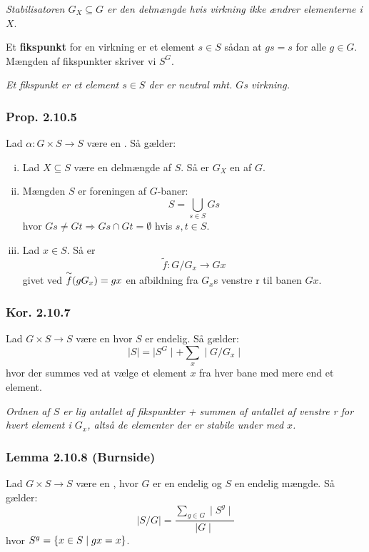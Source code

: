 \textit{Stabilisatoren $G_X \subseteq G$ er den delmængde hvis virkning
ikke ændrer elementerne i $X$}.

Et \textbf{fikspunkt} for en virkning er et element $s \in S$ sådan at $gs = s$
for alle $g \in G$. Mængden af fikspunkter skriver vi $S^G$.

\textit{Et fikspunkt er et element $s \in S$ der er neutral mht. $G$s virkning.}

\subsubsection{Prop. 2.10.5}
Lad $\alpha: G \times S \rightarrow S$ være en . Så
gælder: \begin{enumerate}[(i)]
  \item Lad $X \subseteq S$ være en delmængde af $S$. Så er $G_X$ en
   af $G$.
  \item Mængden $S$ er foreningen af $G$-baner:
  \begin{equation*}
  S = \bigcup_{s \in S}Gs
  \end{equation*}
  hvor $Gs \neq Gt \Rightarrow Gs \cap Gt = \emptyset$ hvis $s, t \in S$.
  \item Lad $x \in S$. Så er
  \begin{equation*}
  \tilde{f}: G/G_x \rightarrow Gx
  \end{equation*}
  givet ved $\overset{\sim}{f}(gG_x) = gx$ en  
  afbildning fra $G_x$s venstre r til banen $Gx$.
\end{enumerate}

\subsubsection{Kor. 2.10.7}
\label{2.10.7}
Lad $G \times S \rightarrow S$ være en  hvor $S$ er
endelig. Så gælder:
\begin{equation*}
  \mid S\mid = \mid S^G\mid + \sum_x \mid G/G_x\mid
\end{equation*}
hvor der summes ved at vælge et element $x$ fra hver bane med mere end et
element.

\textit{Ordnen af $S$ er lig antallet af fikspunkter + summen af antallet af
venstre r for hvert element i $G_x$, altså de elementer der
er stabile under  med $x$.}

\subsubsection{Lemma 2.10.8 (Burnside)}
Lad $G \times S \rightarrow S$ være en , hvor $G$ er en
endelig  og $S$ en endelig mængde. Så gælder:
\begin{equation*}
  \mid S/G\mid = \frac{\sum_{g \in G}\mid S^g\mid}{\mid G\mid}
\end{equation*}
hvor $S^g = \{ x \in S\mid gx = x \}$.

